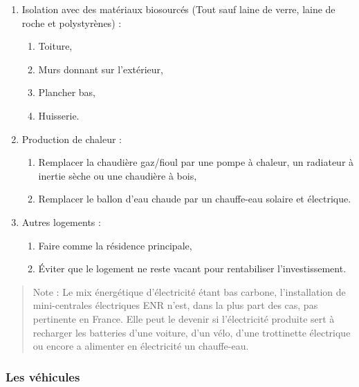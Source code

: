 \begin{enumerate}
\def\labelenumi{\arabic{enumi}.}
\tightlist
\item
  Isolation avec des matériaux biosourcés (Tout sauf laine de verre,
  laine de roche et polystyrènes) :

  \begin{enumerate}
  \def\labelenumii{\arabic{enumii}.}
  \tightlist
  \item
    Toiture,
  \item
    Murs donnant sur l'extérieur,
  \item
    Plancher bas,
  \item
    Huisserie.\\
  \end{enumerate}
\item
  Production de chaleur :

  \begin{enumerate}
  \def\labelenumii{\arabic{enumii}.}
  \tightlist
  \item
    Remplacer la chaudière gaz/fioul par une pompe à chaleur, un
    radiateur à inertie sèche ou une chaudière à bois,
  \item
    Remplacer le ballon d'eau chaude par un chauffe-eau solaire et
    électrique.\\
  \end{enumerate}
\item
  Autres logements :

  \begin{enumerate}
  \def\labelenumii{\arabic{enumii}.}
  \tightlist
  \item
    Faire comme la résidence principale,
  \item
    Éviter que le logement ne reste vacant pour rentabiliser
    l'investissement.
  \end{enumerate}
\end{enumerate}

\begin{quote}
Note : Le mix énergétique d'électricité étant bas carbone,
l'installation de mini-centrales électriques ENR n'est, dans la plus
part des cas, pas pertinente en France. Elle peut le devenir si
l'électricité produite sert à recharger les batteries d'une voiture,
d'un vélo, d'une trottinette électrique ou encore a alimenter en
électricité un chauffe-eau.
\end{quote}

\hypertarget{les-vuxe9hicules}{%
\subsubsection{Les véhicules}\label{les-vuxe9hicules}}

